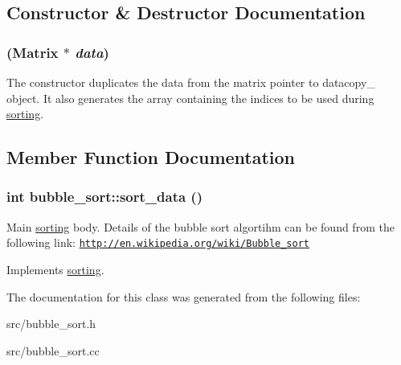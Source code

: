 \subsection{Constructor \& Destructor Documentation}
\hypertarget{classbubble__sort_aa413fc87fd7b9a0da354c0da0bfc0fa2}{
\subsubsection[{bubble\_\-sort}]{ ({\bf Matrix} $\ast$ {\em data})}}
\label{dc/d2f/classbubble__sort_aa413fc87fd7b9a0da354c0da0bfc0fa2}
The constructor duplicates the data from the matrix pointer to datacopy\_\- object. It also generates the array containing the indices to be used during \hyperlink{classsorting}{sorting}. 

\subsection{Member Function Documentation}
\hypertarget{classbubble__sort_a8fdc845adc8e24bbb169b79ef5140ee2}{
\subsubsection[{sort\_\-data}]{\setlength{\rightskip}{0pt plus 5cm}int bubble\_\-sort::sort\_\-data ()}}
\label{dc/d2f/classbubble__sort_a8fdc845adc8e24bbb169b79ef5140ee2}


Main \hyperlink{classsorting}{sorting} body. Details of the bubble sort algortihm can be found from the following link: \href{http://en.wikipedia.org/wiki/Bubble_sort}{\tt http://en.wikipedia.org/wiki/Bubble\_\-sort} 

Implements \hyperlink{classsorting_a94c4b729732743299f3dcd2505312381}{sorting}.

The documentation for this class was generated from the following files:\begin{DoxyCompactItemize}
\item 
src/bubble\_\-sort.h\item 
src/bubble\_\-sort.cc\end{DoxyCompactItemize}
